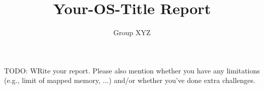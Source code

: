 \documentclass[10pt,a4paper,titlepage]{report}
\title{Your-OS-Title Report}
\author{Group XYZ}
\begin{document}
	
	\maketitle
	
	TODO: WRite your report. Please also mention whether you have any limitations
	(e.g., limit of mapped memory, ...) and/or whether you've done extra challenges.
	
	
	
	
	
	
	

		
	 
	
	
	
	
\end{document}
